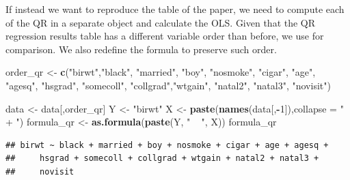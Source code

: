 \documentclass[]{book}
\newenvironment{Shaded}{\begin{snugshade}}{\end{snugshade}}
\newcommand{\KeywordTok}[1]{\textcolor[rgb]{0.13,0.29,0.53}{\textbf{#1}}}
\newcommand{\DataTypeTok}[1]{\textcolor[rgb]{0.13,0.29,0.53}{#1}}
\newcommand{\DecValTok}[1]{\textcolor[rgb]{0.00,0.00,0.81}{#1}}
\newcommand{\StringTok}[1]{\textcolor[rgb]{0.31,0.60,0.02}{#1}}
\newcommand{\OperatorTok}[1]{\textcolor[rgb]{0.81,0.36,0.00}{\textbf{#1}}}
\newcommand{\NormalTok}[1]{#1}
\begin{document}
If instead we want to reproduce the table of the paper, we need to
compute each of the QR in a separate object and calculate the OLS. Given
that the QR regression results table has a different variable order than
before, we use for comparison. We also redefine the formula to preserve
such order.

\begin{Shaded}
\begin{Highlighting}[]
\NormalTok{order_qr <-}\StringTok{ }\KeywordTok{c}\NormalTok{(}\StringTok{"birwt"}\NormalTok{,}\StringTok{"black"}\NormalTok{, }\StringTok{"married"}\NormalTok{, }\StringTok{"boy"}\NormalTok{, }\StringTok{"nosmoke"}\NormalTok{, }\StringTok{"cigar"}\NormalTok{, }\StringTok{"age"}\NormalTok{, }\StringTok{"agesq"}\NormalTok{, }\StringTok{"hsgrad"}\NormalTok{, }\StringTok{"somecoll"}\NormalTok{, }\StringTok{"collgrad"}\NormalTok{,}\StringTok{"wtgain"}\NormalTok{, }\StringTok{"natal2"}\NormalTok{, }\StringTok{"natal3"}\NormalTok{, }\StringTok{"novisit"}\NormalTok{)}

\NormalTok{data <-}\StringTok{ }\NormalTok{data[,order_qr]}
\NormalTok{Y <-}\StringTok{ "birwt"}
\NormalTok{X <-}\StringTok{ }\KeywordTok{paste}\NormalTok{(}\KeywordTok{names}\NormalTok{(data[,}\OperatorTok{-}\DecValTok{1}\NormalTok{]),}\DataTypeTok{collapse =} \StringTok{" + "}\NormalTok{)}
\NormalTok{formula_qr <-}\StringTok{ }\KeywordTok{as.formula}\NormalTok{(}\KeywordTok{paste}\NormalTok{(Y, }\StringTok{" ~ "}\NormalTok{, X))}
\NormalTok{formula_qr}
\end{Highlighting}
\end{Shaded}

\begin{verbatim}
## birwt ~ black + married + boy + nosmoke + cigar + age + agesq +
##     hsgrad + somecoll + collgrad + wtgain + natal2 + natal3 +
##     novisit
\end{verbatim}
\end{document}
